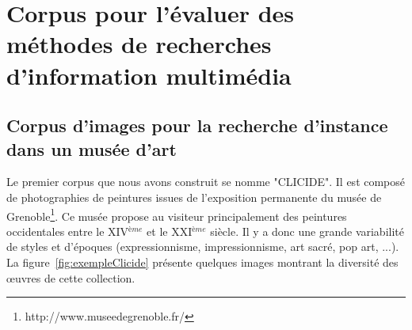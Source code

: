 %
%
\chapter{Corpus pour l'évaluer des méthodes de recherches d'information multimédia}

\section{Corpus d'images pour la recherche d'instance dans un musée d'art}
\label{chap:corpus}

Le premier corpus que nous avons construit se nomme "CLICIDE". 
Il est composé de photographies de peintures issues de l'exposition permanente du musée de Grenoble\footnote{http://www.museedegrenoble.fr/}. 
Ce musée propose au visiteur principalement des peintures occidentales entre le XIV$^{\text{\`e}me}$ et le XXI$^{\text{\`e}me}$ siècle. 
Il y a donc une grande variabilité de styles et d'époques (expressionnisme, impressionnisme, art sacré, pop art, ...). 
La figure~\ref{fig:exempleClicide} présente quelques images montrant la diversité des œuvres de cette collection.

